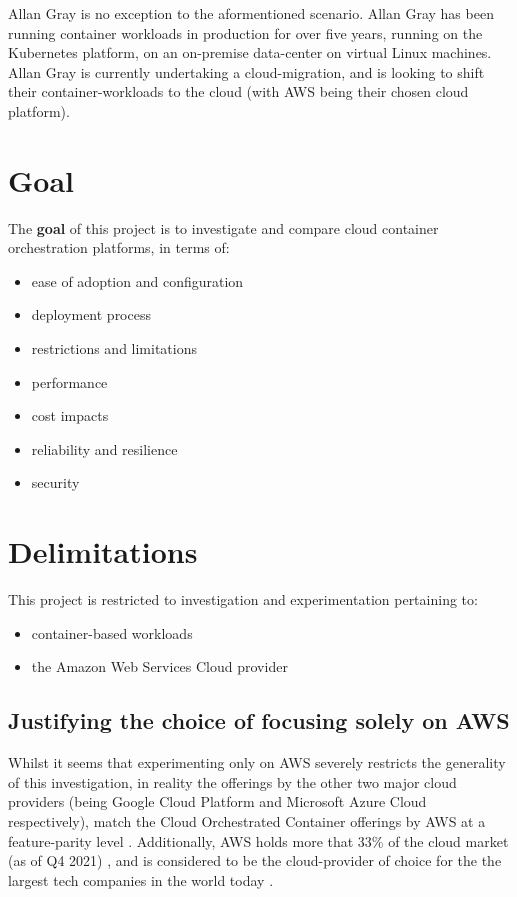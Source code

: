 \noindent Allan Gray is no exception to the aformentioned scenario. Allan Gray has been running container workloads in production for over five years,
running on the Kubernetes platform, on an on-premise data-center on virtual Linux machines.
Allan Gray is currently undertaking a cloud-migration, and is looking to shift their container-workloads to the cloud (with AWS being their chosen cloud platform).

\chapter{Goal}
\noindent The \textbf{goal} of this project is to investigate and compare cloud container orchestration platforms, in terms of:
\begin{itemize}
  \item ease of adoption and configuration
  \item deployment process
  \item restrictions and limitations
  \item performance
  \item cost impacts
  \item reliability and resilience
  \item security
\end{itemize}

\chapter{Delimitations}
This project is restricted to investigation and experimentation pertaining to:
\begin{itemize}
  \item container-based workloads
  \item the Amazon Web Services Cloud provider
\end{itemize}

\section{Justifying the choice of focusing solely on AWS}
Whilst it seems that experimenting only on AWS severely restricts the generality of this investigation, in reality the offerings by the other two major cloud providers
(being Google Cloud Platform and Microsoft Azure Cloud respectively), match the Cloud Orchestrated Container offerings by AWS at a feature-parity level \cite{contaier_workloads}.
Additionally, AWS holds more that 33\% of the cloud market (as of Q4 2021) \cite{aws_cloud_share},
and is considered to be the cloud-provider of choice for the the largest tech companies in the world today \cite{aws_users}.

